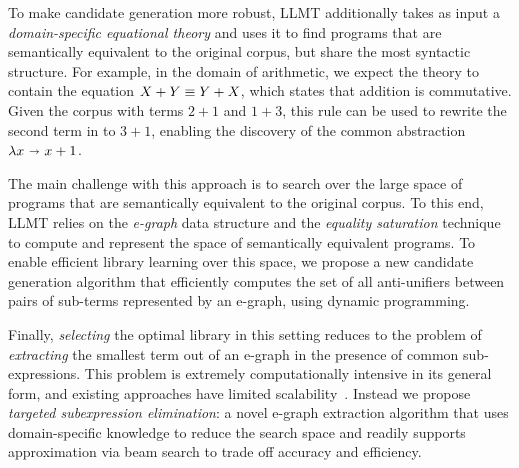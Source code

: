 %
To make candidate generation more robust,
LLMT additionally takes as input a \emph{domain-specific equational theory} %
and uses it to find programs that are semantically equivalent to the original corpus,
but share the most syntactic structure.
%
For example, in the domain of arithmetic, we expect the theory to contain the equation
$X + Y  \equiv  Y + X$,
which states that addition is commutative.
%
Given the corpus with terms $2 + 1$ and $1 + 3$,
this rule can be used to rewrite the second term in to $3 + 1$,
enabling the discovery of the common abstraction $\lambda x \ \mathbf{\shortrightarrow}\  x + 1$.


The main challenge with this approach is to search over the large space of programs
that are semantically equivalent to the original corpus.
%
To this end, LLMT relies on the \emph{e-graph} data structure
and the \emph{equality saturation} technique~\cite{tate2009equality,willsey2021egg}
to compute and represent the space of semantically equivalent programs.
%
To enable efficient library learning over this space,
we propose a new candidate generation algorithm
that efficiently computes the set of all anti-unifiers
between pairs of sub-terms represented by an e-graph,
using dynamic programming.

Finally, \emph{selecting} the optimal library
  in this setting reduces to the problem of
  \emph{extracting} the smallest term out of an e-graph
  in the presence of common sub-expressions.
%
This problem is extremely computationally intensive in its general form,
and existing approaches have limited scalability~\cite{tensat}.
%
Instead we propose \emph{targeted subexpression elimination}:
a novel e-graph extraction algorithm
that uses domain-specific knowledge to reduce the search space
and readily supports approximation via beam search to trade off accuracy and efficiency.

